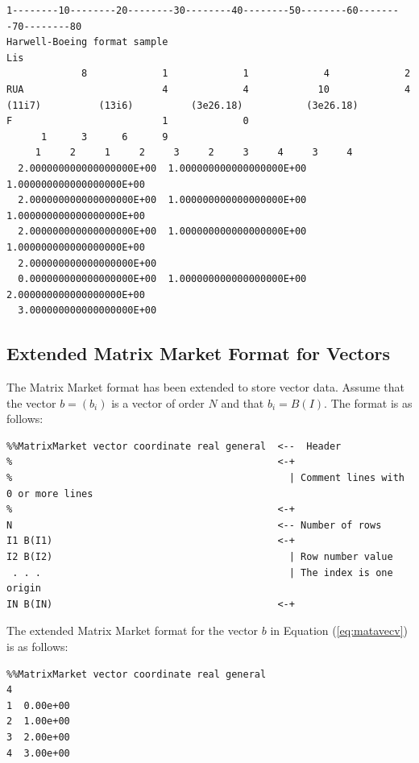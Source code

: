 \documentclass[a4paper]{article}
\begin{document}
{\small
\begin{verbatim}
1--------10--------20--------30--------40--------50--------60--------70--------80
Harwell-Boeing format sample                                            Lis
             8             1             1             4             2
RUA                        4             4            10             4
(11i7)          (13i6)          (3e26.18)           (3e26.18)
F                          1             0
      1      3      6      9
     1     2     1     2     3     2     3     4     3     4
  2.000000000000000000E+00  1.000000000000000000E+00  1.000000000000000000E+00
  2.000000000000000000E+00  1.000000000000000000E+00  1.000000000000000000E+00
  2.000000000000000000E+00  1.000000000000000000E+00  1.000000000000000000E+00
  2.000000000000000000E+00
  0.000000000000000000E+00  1.000000000000000000E+00  2.000000000000000000E+00
  3.000000000000000000E+00
\end{verbatim}
}

\subsection{Extended Matrix Market Format for Vectors}
The Matrix Market format\cite{matrixmarket} has been extended to store
vector data. Assume that the vector $b=(b_{i})$ is a vector of order
$N$ and that $b_{i} = B(I)$. The format is as follows:

{\small
\begin{verbatim}
%%MatrixMarket vector coordinate real general  <--  Header
%                                              <-+ 
%                                                | Comment lines with 0 or more lines
%                                              <-+
N                                              <-- Number of rows
I1 B(I1)                                       <-+
I2 B(I2)                                         | Row number value
 . . .                                           | The index is one origin
IN B(IN)                                       <-+ 
\end{verbatim}
}

The extended Matrix Market format for the vector $b$ in Equation (\ref{eq:matavecv}) is as follows:

{\small
\begin{verbatim}
%%MatrixMarket vector coordinate real general
4
1  0.00e+00
2  1.00e+00
3  2.00e+00
4  3.00e+00
\end{verbatim}
}
\end{document}
